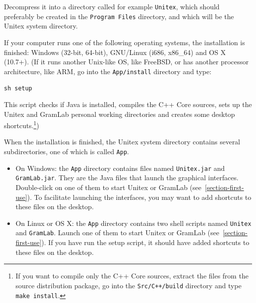 \noindent Decompress it into a directory called for example {\tt Unitex\UnitexVersion{}}, which
should preferably be created in the \verb+Program Files+ directory,
and which will be the Unitex system directory.

\bigskip
\noindent If your computer runs one of the following operating systems, the installation is finished: Windows (32-bit, 64-bit), GNU/Linux (i686, x86\_64) and OS X (10.7+). (If it runs another Unix-like OS, like FreeBSD, or has another processor architecture, like ARM, go into the \verb+App/install+ directory and type:

\begin{flushleft}
\verb+sh setup+
\end{flushleft}

\noindent This script checks if Java is installed, compiles the C++ Core sources, sets up the
Unitex and GramLab personal working directories and creates some desktop shortcuts.\footnote{If
you want to compile only the C++ Core sources, extract the files from the source
distribution package, go into the {\tt Src/C++/build} directory and type {\tt make install}.})

\bigskip
\noindent When the installation is finished, the Unitex system directory contains several
subdirectories,  one  of which is called \verb+App+.
\begin{itemize}
\item On Windows: the \verb+App+ directory contains files named
\verb+Unitex.jar+ and \verb+GramLab.jar+. They are the Java files that
launch the graphical interfaces. Double-click on one of them to start Unitex or GramLab
(see~\ref{section-first-use}). To facilitate launching the interfaces, you may want to add shortcuts
to these files on the desktop.
\item On Linux or OS X: the \verb+App+ directory contains two
shell scripts named \verb+Unitex+ and \verb+GramLab+. Launch one of them
to start Unitex or GramLab (see~\ref{section-first-use}). If you have run the setup script, it should have added
shortcuts to these files on the desktop.
\end{itemize}

